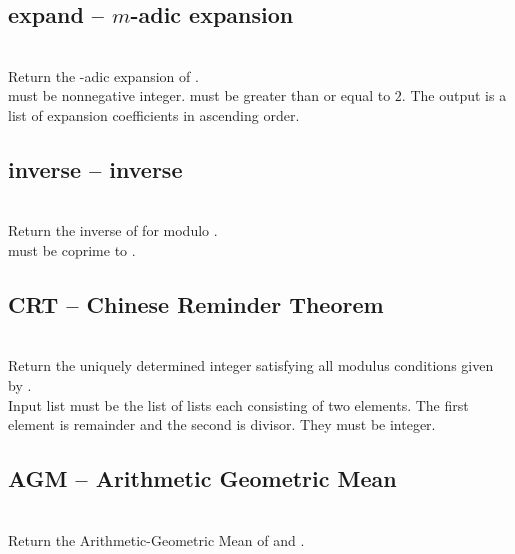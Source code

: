 \subsection{expand -- $m$-adic expansion}
\\
\spacing
\quad Return the -adic expansion of .\\ 
\spacing
\quad {} must be nonnegative integer.  must be greater than or equal to $2$.  The output is a list of expansion coefficients in ascending order.\\
%
\subsection{inverse -- inverse}
\\
\spacing
\quad Return the inverse of  for modulo .\\
\spacing
\quad {} must be coprime to .\\
%
\subsection{CRT -- Chinese Reminder Theorem}
\\
\spacing
\quad Return the uniquely determined integer satisfying all modulus
conditions given by .\\
\spacing
\quad Input list  must be the list of lists each consisting of two elements.
The first element is remainder and the second is divisor.
They must be integer.\\
%
\subsection{AGM -- Arithmetic Geometric Mean}
\\
\spacing
\quad Return the Arithmetic-Geometric Mean of  and .\\
%
%
